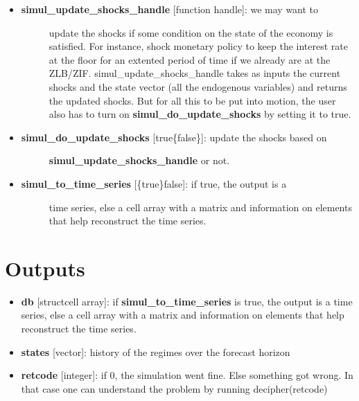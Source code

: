 \documentclass[letterpaper,10pt,english]{sphinxmanual}
\begin{document}
\begin{itemize}
\begin{itemize}
\item {} \begin{description}
\item[{\textbf{simul\_update\_shocks\_handle} {[}function handle{]}: we may want to}] \leavevmode
update the shocks if some condition on the state of the economy is
satisfied. For instance, shock monetary policy to keep the interest
rate at the floor for an extented period of time if we already are
at the ZLB/ZIF. simul\_update\_shocks\_handle takes as inputs the
current shocks and the state vector (all the endogenous variables)
and returns the updated shocks. But for all this to be put into
motion, the user also has to turn on \textbf{simul\_do\_update\_shocks} by
setting it to true.

\end{description}

\item {} \begin{description}
\item[{\textbf{simul\_do\_update\_shocks} {[}true\textbar{}\{false\}{]}: update the shocks based on}] \leavevmode
\textbf{simul\_update\_shocks\_handle} or not.

\end{description}

\item {} \begin{description}
\item[{\textbf{simul\_to\_time\_series} {[}\{true\}\textbar{}false{]}: if true, the output is a}] \leavevmode
time series, else a cell array with a matrix and information on
elements that help reconstruct the time series.

\end{description}

\end{itemize}

\end{itemize}


\section{Outputs}
\label{classes/models/@svar/svar:id112}\begin{itemize}
\item {} 
\textbf{db} {[}struct\textbar{}cell array{]}: if \textbf{simul\_to\_time\_series} is true, the
output is a time series, else a cell array with a matrix and
information on elements that help reconstruct the time series.

\item {} 
\textbf{states} {[}vector{]}: history of the regimes over the forecast horizon

\item {} 
\textbf{retcode} {[}integer{]}: if 0, the simulation went fine. Else something
got wrong. In that case one can understand the problem by running
decipher(retcode)

\end{itemize}
\end{document}
